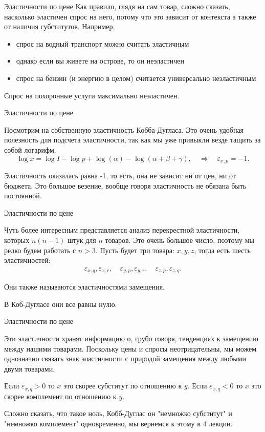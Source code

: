 \documentclass{beamer}
\begin{document}
\begin{frame}{Эластичности по цене}
Как правило, глядя на сам товар, сложно сказать, насколько эластичен спрос на него, потому что это зависит от контекста а также от наличия субститутов. Например,

\begin{itemize}
  \item спрос на водный транспорт можно считать эластичным
  \item однако если вы живете на острове, то он неэластичен
  \item спрос на бензин (и энергию в целом) считается универсально неэластичным
\end{itemize}

Спрос на похоронные услуги максимально неэластичен.
\end{frame}


\begin{frame}{Эластичности по цене}

Посмотрим на собственную эластичность Кобба-Дугласа. Это очень удобная полезность для подсчета эластичности, так как мы уже привыкли везде тащить за собой логарифм.
$$\log x = \log I - \log p + \log(\alpha) - \log(\alpha + \beta + \gamma), \quad \Rightarrow \quad \varepsilon_{x,p} = -1.$$

Эластичность оказалась равна -1, то есть, она не зависит ни от цен, ни от бюджета. Это большое везение, вообще говоря эластичность не обязана быть постоянной.

\end{frame}

\begin{frame}{Эластичности по цене}

Чуть более интересным представляется анализ перекрестной эластичности, которых $n(n-1)$ штук для $n$ товаров. Это очень большое число, поэтому мы редко будем работать с $n>3$. Пусть будет три товара: $x,y,z$, тогда есть шесть эластичностей:
\begin{gather*}
\varepsilon_{x,q}, \varepsilon_{x,r}, \quad \varepsilon_{y,p}, \varepsilon_{y,r}, \quad \varepsilon_{z,p}, \varepsilon_{z,q}.
\end{gather*}

Они также называются \alert{эластичностями замещения}.

В Коб-Дугласе они все равны нулю.

\end{frame}

\begin{frame}{Эластичности по цене}

Эти эластичности хранят информацию о, грубо говоря, тенденциях к замещению между нашими товарами. Поскольку цены и спросы неотрицательны, мы можем однозначно связать знак эластичности с природой замещения между любыми двумя товарами.

Если $\varepsilon_{x,q} > 0$ то $x$ это скорее субститут по отношению к $y$. Если $\varepsilon_{x,q} < 0$ то $x$ это скорее комплемент по отношению к $y$.

Сложно сказать, что такое ноль, Кобб-Дуглас он "немножко субститут" и "немножко комплемент" одновременно, мы вернемся к этому в 4 лекции.

\end{frame}
\end{document}

